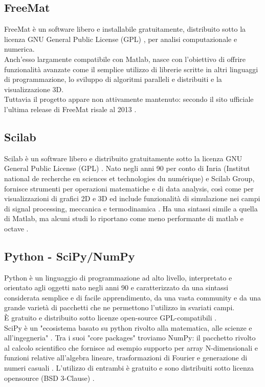 \subsection{FreeMat}
FreeMat è un software libero e installabile gratuitamente, distribuito sotto la licenza GNU General Public License (GPL) \cite{gnu_gpl:1}, per analisi computazionale e numerica.\\
Anch'esso largamente compatibile con Matlab, nasce con l'obiettivo di offrire funzionalità avanzate come il semplice utilizzo di librerie scritte in altri linguaggi di programmazione, lo sviluppo di algoritmi paralleli e distribuiti e la visualizzazione 3D.\\
Tuttavia il progetto appare non attivamente mantenuto: secondo il sito ufficiale l'ultima release di FreeMat risale al 2013 \cite{freemat:1}.

\subsection{Scilab}
Scilab è un software libero e distribuito gratuitamente sotto la licenza GNU General Public License (GPL) \cite{gnu_gpl:1}.
Nato negli anni 90 per conto di Inria (Institut national de recherche en sciences et technologies du numérique) e Scilab Group, fornisce strumenti per operazioni matematiche e di data analysis, così come per visualizzazioni di grafici 2D e 3D ed include funzionalità di simulazione nei campi di signal processing, meccanica e termodinamica \cite{scilab:1}.
Ha una sintassi simile a quella di Matlab, ma alcuni studi lo riportano come meno performante di matlab e octave \cite{matlab_octave_scilab_comp:1}.

\subsection{Python - SciPy/NumPy}
Python è un linguaggio di programmazione ad alto livello, interpretato e orientato agli oggetti \cite{what_is_python:1} nato negli anni 90 \cite{python_history:1} e
caratterizzato da una sintassi considerata semplice e di facile apprendimento, da una vasta community e da una grande varietà
di pacchetti che ne permettono l'utilizzo in svariati campi.\\
È gratuito e distribuito sotto licenze open-source GPL-compatibili \cite{python_history:1}.
\\
SciPy è un "ecosistema basato su python rivolto alla matematica, alle scienze e all'ingegneria" \cite{scipy:1}. Tra i suoi "core packages" troviamo NumPy: il pacchetto rivolto al calcolo scientifico che fornisce ad esempio supporto per array N-dimensionali e funzioni relative all'algebra lineare, trasformazioni di Fourier e generazione di numeri casuali \cite{numpy:1}. L'utilizzo di entrambi è gratuito e sono distribuiti sotto licenza opensource (BSD 3-Clause) \cite{scipy_license:1} \cite{numpy_license:1}. 

